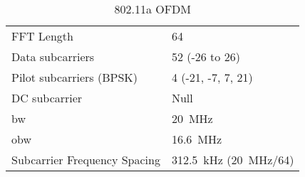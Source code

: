 \begin{table}[]
    \centering
    \begin{tabular}{ll}
    \toprule
         FFT Length &  64\\
         Data subcarriers & 52 (-26 to 26)\\
         Pilot subcarriers (BPSK) & 4 (-21, -7, 7, 21)\\
         DC subcarrier & Null\\
         \Gls{bw} & \SI{20}{\mega\hertz}\\
         \Gls{obw} & \SI{16.6}{\mega\hertz}\\
         Subcarrier Frequency Spacing &	\SI{312.5}{\kilo\hertz}   (\SI{20}{\mega\hertz}/64)\\
         \bottomrule
    \end{tabular}
    \caption{802.11a OFDM}
    \label{tab:ofdm_params}
\end{table}

